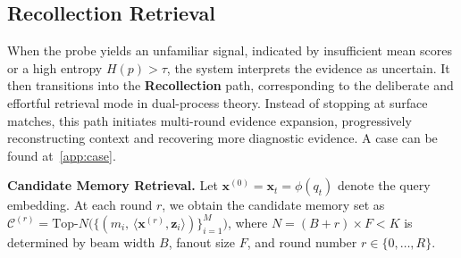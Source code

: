 
\subsection{Recollection Retrieval}
When the probe yields an unfamiliar signal, indicated by insufficient mean scores or a high entropy $H(p) > \tau$, the system interprets the evidence as uncertain. It then transitions into the \textbf{Recollection} path, corresponding to the deliberate and effortful retrieval mode in dual-process theory. Instead of stopping at surface matches, this path initiates multi-round evidence expansion, progressively reconstructing context and recovering more diagnostic evidence. A case can be found at~\ref{app:case}.

\textbf{Candidate Memory Retrieval.}
Let $\mathbf{x}^{(0)} = \mathbf{x}_t=\phi(q_t)$ denote the query embedding. At each round $r$, we obtain the candidate memory set as $\mathcal{C}^{(r)}=\text{Top-}N\Big(\{(m_i,\,\langle \mathbf{x}^{(r)},\mathbf{z}_i\rangle)\}_{i=1}^{M}\Big)$, where $N=(B+r) \times F<K$ is determined by beam width $B$,  fanout size $F$, and round number $r \in \{0,\dots,R\}$. 




